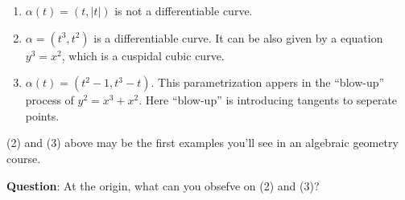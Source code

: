 \begin{example}
    \hfill
    \begin{enumerate}[(1)]
        \item $\alpha(t)=(t,|t|)$ is not a differentiable curve.
        \begin{center}
        \end{center}
        \item $\alpha=(t^3,t^2)$ is a differentiable curve. It can be also given by a equation $y^3=x^2$, which is a cuspidal cubic curve.
        \begin{center}
        \end{center}
        \item $\alpha(t)=(t^2-1,t^3-t)$. This parametrization appers in the ``blow-up'' process of $y^2=x^3+x^2$. Here ``blow-up'' is introducing tangents to seperate points.
        \begin{center}
        \end{center}
    \end{enumerate}
\end{example}
\begin{remark}
    (2) and (3) above may be the first examples you'll see in an algebraic geometry course.
\end{remark}
\noindent
\textbf{Question}: At the origin, what can you obsefve on (2) and (3)?

